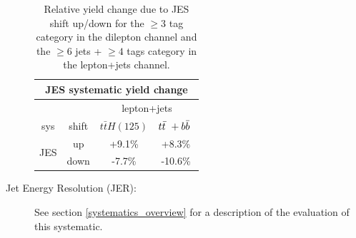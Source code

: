 \begin{description}
\begin{table}[hbtp] 
  \centering 
   \begin{tabular}{|c|c|c|c|} \hline 
\multicolumn{4}{|c|}{JES systematic yield change} \\ \hline
\multicolumn{2}{|c}{ } & \multicolumn{2}{|c|}{lepton+jets} \\ \hline
sys & shift & $t\bar{t}H(125)$ & $t{\bar{t}}~+b{\bar{b}}~$  \\ \hline 
\multirow{2}{*}{JES} & up   & +9.1\% & +8.3\% \\
                     & down & -7.7\% & -10.6\% \\ \hline
  \end{tabular} 
  \caption{Relative yield change due to JES shift up/down for the
    $\geq$3 tag category in the dilepton channel and the $\geq 6$ jets + $\geq 4$ tags category in the
    lepton+jets channel.}
  \label{tab:JESShift_II}
\end{table} 


\item[Jet Energy Resolution (JER):] See section \ref{systematics_overview}
  for a description of the evaluation of this systematic.  


\end{description}
